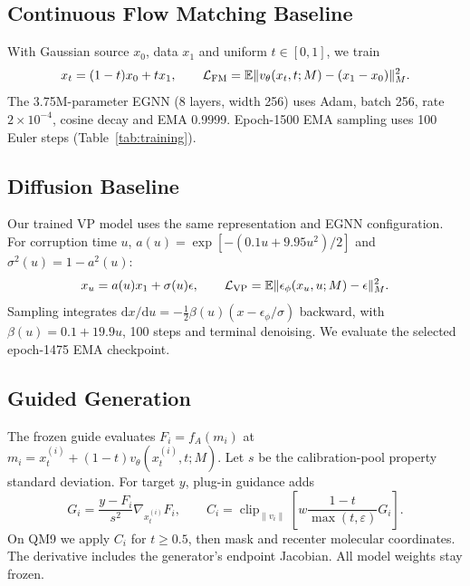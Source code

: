\documentclass{article}
\begin{document}
\subsection{Continuous Flow Matching Baseline}\label{sec:fm}
With Gaussian source $x_0$, data $x_1$ and uniform $t\in[0,1]$, we train
\begin{equation}
x_t=(1-t)x_0+tx_1,\qquad \mathcal L_{\rm FM}=\mathbb E\|v_\theta(x_t,t;M)-(x_1-x_0)\|_M^2.
\label{eq:fm}
\end{equation}
The 3.75M-parameter EGNN (8 layers, width 256) uses Adam, batch 256, rate $2\times10^{-4}$, cosine decay and EMA 0.9999. Epoch-1500 EMA sampling uses 100 Euler steps (Table~\ref{tab:training}).

\subsection{Diffusion Baseline}\label{sec:diff}
Our trained VP model uses the same representation and EGNN configuration. For corruption time $u$, $a(u)=\exp[-(0.1u+9.95u^2)/2]$ and $\sigma^2(u)=1-a^2(u)$:
\begin{equation}
x_u=a(u)x_1+\sigma(u)\epsilon,\qquad\mathcal L_{\rm VP}=\mathbb E\|\epsilon_\phi(x_u,u;M)-\epsilon\|_M^2.
\label{eq:vp}
\end{equation}
Sampling integrates $\mathrm dx/\mathrm du=-\frac12\beta(u)(x-\epsilon_\phi/\sigma)$ backward, with $\beta(u)=0.1+19.9u$, 100 steps and terminal denoising. We evaluate the selected epoch-1475 EMA checkpoint.

\subsection{Guided Generation}\label{sec:guidance}
The frozen guide evaluates $F_i=f_A(m_i)$ at $m_i=x_t^{(i)}+(1-t)v_\theta(x_t^{(i)},t;M)$. Let $s$ be the calibration-pool property standard deviation. For target $y$, plug-in guidance adds
\begin{equation}
G_i=\frac{y-F_i}{s^2}\nabla_{x_t^{(i)}}F_i,\qquad
C_i=\operatorname{clip}_{\|v_i\|}\!\left[w\frac{1-t}{\max(t,\varepsilon)}G_i\right].
\label{eq:plug}
\end{equation}
On QM9 we apply $C_i$ for $t\ge0.5$, then mask and recenter molecular coordinates. The derivative includes the generator's endpoint Jacobian. All model weights stay frozen.
\end{document}
